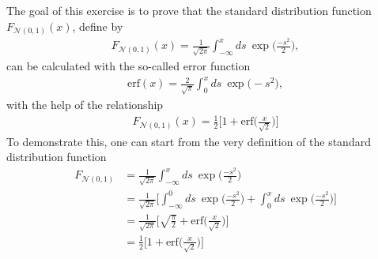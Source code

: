 \documentclass[11pt]{report}
\begin{document}
The goal of this exercise is to prove that the standard distribution function $F_{\mathcal{N}(0,1)}(x)$, define by
\begin{align}
	F_{\mathcal{N}(0,1)}(x)=\frac1{\sqrt{2\pi}}\int_{-\infty}^x ds\ \exp\bigg(\frac{-s^2}{2}\bigg),
\end{align}
can be calculated with the so-called error function
\begin{align}
	\text{erf}(x)=\frac2{\sqrt{\pi}}\int_0^x ds\ \exp\big(-s^2),
\end{align}
with the help of the relationship
\begin{align}
	F_{\mathcal{N}(0,1)}(x)=\frac12\bigg[1+\text{erf}\bigg(\frac{x}{\sqrt{2}}\bigg)\bigg]
\end{align}
To demonstrate this, one can start from the very definition of the standard distribution function
\begin{align}
	F_{\mathcal{N}(0,1)}&=\frac1{\sqrt{2\pi}}\int_{-\infty}^x ds\ \exp\bigg(\frac{-s^2}2\bigg)\nonumber\\
	&=\frac1{\sqrt{2\pi}}\bigg[\int_{-\infty}^0ds\ \exp\bigg(\frac{-s^2}2\bigg)+\int_0^x ds\ \exp\bigg(\frac{-s^2}2\bigg)\bigg]\nonumber\\
	&=\frac1{\sqrt{2\pi}}\bigg[\sqrt{\frac{\pi}2}+\text{erf}\bigg(\frac{x}{\sqrt{2}}\bigg)\bigg]\nonumber\\
	&=\frac12\bigg[1+\text{erf}\bigg(\frac{x}{\sqrt{2}}\bigg)\bigg]
\end{align}
\end{document}
